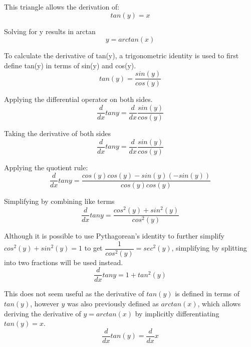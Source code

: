 \documentclass[12pt, titlepage]{article}
\begin{document}
This triangle allows the derivation of:
\begin{equation*}
 tan(y) = x
\end{equation*}

Solving for y results in arctan
\begin{equation*}
  y = arctan(x)
\end{equation*}

To calculate the derivative of tan(y), a trigonometric identity is used to first define tan(y) in terms of sin(y) and cos(y).
\begin{equation*}
 tan(y) = \frac{sin(y)}{cos(y)}
\end{equation*}

Applying the differential operator on both sides.
\begin{equation*}
  \frac{d}{dx} tany = \frac{d}{dx} \frac{sin(y)}{cos(y)}
\end{equation*}

Taking the derivative of both sides
\begin{equation*}
  \frac{d}{dx} tany = \frac{d}{dx} \frac{sin(y)}{cos(y)}
\end{equation*}

Applying the quotient rule:
\begin{equation*}
  \frac{d}{dx} tany = \frac{cos(y)cos(y) - sin(y)(-sin(y))}{cos(y)cos(y)}
\end{equation*}

Simplifying by combining like terms
\begin{equation*}
  \frac{d}{dx} tany = \frac{cos^{2}(y) + sin^{2}(y)}{cos^{2}(y)}
\end{equation*}

Although it is possible to use Pythagorean's identity to further simplify \(cos^{2}(y) + sin^{2}(y) = 1\) to get \(\dfrac{1}{cos^{2}(y)} = sec^{2}(y)\), simplifying by splitting into two fractions will be used instead. 
\begin{equation*}
  \frac{d}{dx} tany = 1 + tan^{2}(y)
\end{equation*}

This does not seem useful as the derivative of \(tan(y)\) is defined in terms of \(tan(y)\), however \(y\) was also previously defined as \(arctan(x)\), which allows deriving the derivative of \(y = arctan(x)\) by implicitly differentiating \(tan(y) = x\).
\begin{equation*}
 \frac{d}{dx} tan(y) = \frac{d}{dx} x
\end{equation*}
\end{document}
